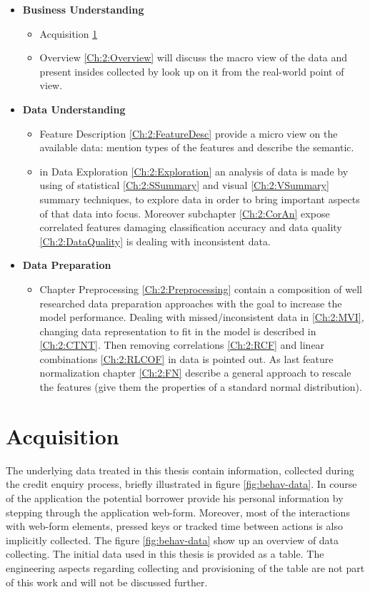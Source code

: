 \begin{itemize}
    \item \textbf{Business Understanding }  
    \begin{itemize}
        \item Acquisition \ref{Ch:2:Acquisition} 
        \item Overview \ref{Ch:2:Overview} will discuss the macro view of the data and present insides collected by look up on it from the real-world point of view.
    \end{itemize}
    \item \textbf{Data Understanding }
        \begin{itemize}
            \item Feature Description \ref{Ch:2:FeatureDesc} provide a micro view on the available data: mention types of the features and describe the semantic.
            \item in Data Exploration \ref{Ch:2:Exploration} an  analysis of data is made by using of statistical \ref{Ch:2:SSummary} and visual \ref{Ch:2:VSummary} summary techniques, to explore data in order to bring important aspects of that data into focus. Moreover subchapter \ref{Ch:2:CorAn} expose correlated features damaging classification accuracy and data quality \ref{Ch:2:DataQuality} is dealing with inconsistent data.
        \end{itemize}
    \item \textbf{Data Preparation }
            \begin{itemize}
                \item Chapter Preprocessing \ref{Ch:2:Preprocessing} contain a composition of well researched data preparation approaches with the goal to increase the model performance. Dealing with missed/inconsistent data in \ref{Ch:2:MVI}, changing data representation to fit in the model is described in \ref{Ch:2:CTNT}. Then removing correlations \ref{Ch:2:RCF} and linear combinations \ref{Ch:2:RLCOF} in data is pointed out. As last feature normalization chapter \ref{Ch:2:FN} describe a general approach to rescale the features (give them the properties of a standard normal distribution).
        \end{itemize}
\end{itemize}

\section{Acquisition}\label{Ch:2:Acquisition}
The underlying data treated in this thesis contain information, collected during the credit enquiry process, briefly illustrated in figure \ref{fig:behav-data}. In course of the application the potential borrower provide his personal information by stepping through the application web-form. Moreover, most of the interactions with web-form elements, pressed keys or tracked time between actions is also implicitly collected. The figure \ref{fig:behav-data} show up an overview of data collecting.
The initial data used in this thesis is provided as a table. The engineering aspects regarding collecting and provisioning of the table are not part of this work and will not be discussed further. 

